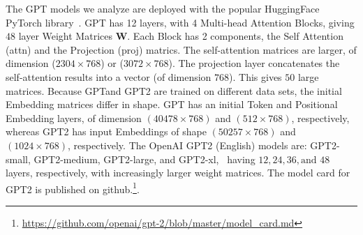 The GPT models we analyze are deployed with the popular HuggingFace PyTorch library~\cite{XXX-XXX}.
GPT has 12 layers, with 4 Multi-head Attention Blocks, giving $48$ layer Weight Matrices $\mathbf{W}$.
Each Block has 2 components, the Self Attention (attn) and the Projection (proj) matrics.  
The self-attention  matrices are larger, of dimension ($2304\times 768$) or ($3072\times 768$).
The projection layer concatenates the self-attention results into a vector (of dimension $768$).
This gives $50$ large matrices.
%
Because GPTand GPT2 are trained on different data sets, the initial Embedding matrices differ in shape.
GPT has an initial Token and Positional Embedding layers, of dimension $(40478\times 768)$ and $(512\times 768)$, respectively, whereas GPT2 has input Embeddings of shape $(50257\times 768)$ and $(1024\times 768)$, respectively. 
%
The OpenAI GPT2 (English) models are: GPT2-small, GPT2-medium, GPT2-large, and GPT2-xl, \
having $12, 24, 36, \text{and }48$ layers, respectively, with increasingly larger weight matrices.
The model card for GPT2 is published on github.\footnote{\url{https://github.com/openai/gpt-2/blob/master/model_card.md}}.


